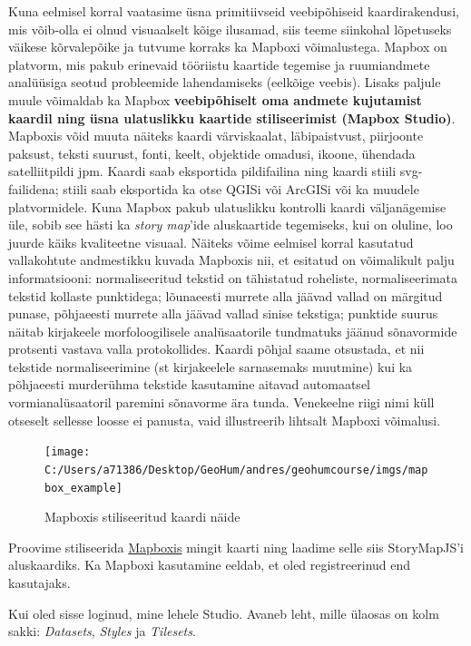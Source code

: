 \documentclass[
]{book}
\begin{document}
Kuna eelmisel korral vaatasime üsna primitiivseid veebipõhiseid kaardirakendusi, mis võib-olla ei olnud visuaalselt kõige ilusamad, siis teeme siinkohal lõpetuseks väikese kõrvalepõike ja tutvume korraks ka Mapboxi võimalustega. Mapbox on platvorm, mis pakub erinevaid tööriistu kaartide tegemise ja ruumiandmete analüüsiga seotud probleemide lahendamiseks (eelkõige veebis). Lisaks paljule muule võimaldab ka Mapbox \textbf{veebipõhiselt oma andmete kujutamist kaardil ning üsna ulatuslikku kaartide stiliseerimist (Mapbox Studio)}. Mapboxis võid muuta näiteks kaardi värviskaalat, läbipaistvust, piirjoonte paksust, teksti suurust, fonti, keelt, objektide omadusi, ikoone, ühendada satelliitpildi jpm. Kaardi saab eksportida pildifailina ning kaardi stiili svg-failidena; stiili saab eksportida ka otse QGISi või ArcGISi või ka muudele platvormidele. Kuna Mapbox pakub ulatuslikku kontrolli kaardi väljanägemise üle, sobib see hästi ka \emph{story map}'ide aluskaartide tegemiseks, kui on oluline, loo juurde käiks kvaliteetne visuaal. Näiteks võime eelmisel korral kasutatud vallakohtute andmestikku kuvada Mapboxis nii, et esitatud on võimalikult palju informatsiooni: normaliseeritud tekstid on tähistatud roheliste, normaliseerimata tekstid kollaste punktidega; lõunaeesti murrete alla jäävad vallad on märgitud punase, põhjaeesti murrete alla jäävad vallad sinise tekstiga; punktide suurus näitab kirjakeele morfoloogilisele analüsaatorile tundmatuks jäänud sõnavormide protsenti vastava valla protokollides. Kaardi põhjal saame otsustada, et nii tekstide normaliseerimine (st kirjakeelele sarnasemaks muutmine) kui ka põhjaeesti murderühma tekstide kasutamine aitavad automaatsel vormianalüsaatoril paremini sõnavorme ära tunda. Venekeelne riigi nimi küll otseselt sellesse loosse ei panusta, vaid illustreerib lihtsalt Mapboxi võimalusi.

\begin{figure}
\texttt{[image: C:/Users/a71386/Desktop/GeoHum/andres/geohumcourse/imgs/mapbox\_example]} \caption{Mapboxis stiliseeritud kaardi näide}\label{fig:mapbox}
\end{figure}

Proovime stiliseerida \href{https://www.mapbox.com/mapbox-studio/}{Mapboxis} mingit kaarti ning laadime selle siis StoryMapJS'i aluskaardiks. Ka Mapboxi kasutamine eeldab, et oled registreerinud end kasutajaks.

Kui oled sisse loginud, mine lehele Studio. Avaneb leht, mille ülaosas on kolm sakki: \emph{Datasets}, \emph{Styles} ja \emph{Tilesets}.
\end{document}
